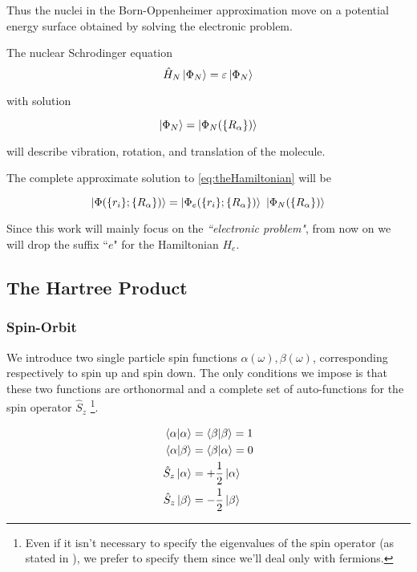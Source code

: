 \documentclass[a4paper,12pt]{article}
\begin{document}
Thus the nuclei in the Born-Oppenheimer approximation move on a potential energy surface obtained by solving the electronic problem.

The nuclear Schrodinger equation  
\begin{equation}
	\hat{H}_{N} \ket{\Phi_{N}} = \varepsilon \ket{\Phi_{N} }
\end{equation}

with solution 

\begin{equation}
	\ket{\Phi_{N}}=\ket{\Phi_{N}(\{R_{\alpha}\})}
\end{equation}

will describe vibration, rotation, and translation of the molecule.

The complete approximate solution to \eqref{eq:theHamiltonian} will be  \cite[p.43-45]{Attila}

\begin{equation}
	\ket{ \Phi(\{r_i\};\{R_{\alpha}\}) } 	= \ket{ \Phi_{e}(\{r_i\};\{R_{\alpha}\})} 
											~ \ket{ \Phi_{N}(\{R_{\alpha}\})}
\end{equation}

Since this work will mainly focus on the \textit{``electronic problem"}, from now on we will drop the suffix ``$e$" for the Hamiltonian $H_{e}$.

\subsection{The Hartree Product}
\subsubsection{Spin-Orbit}
We introduce two single particle spin functions  $\alpha(\omega), \beta(\omega)$, corresponding respectively to spin up and spin down.
The only conditions we impose is that these two functions are orthonormal and a complete set of auto-functions for the spin operator $\hat{S}_z$ \footnote{Even if it isn't necessary to specify the eigenvalues of the spin operator (as stated in \cite{Attila}), we prefer to specify them since we'll deal only with fermions. }.

\begin{align*}
	\bra{\alpha}\ket{\alpha} & = \bra{\beta}\ket{\beta} = 1 \\
	\bra{\alpha}\ket{\beta} & = \bra{\beta}\ket{\alpha} = 0 \\
	\hat{S}_{z} \ket{\alpha} & = + \frac{1}{2} \ket{\alpha} \\
	\hat{S}_{z} \ket{\beta} & = - \frac{1}{2} \ket{\beta} \\
\end{align*}
\end{document}
